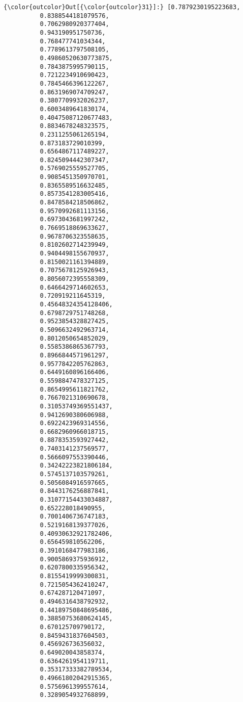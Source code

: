 \documentclass[11pt]{article}
\begin{document}
\begin{Verbatim}[commandchars=\\\{\}]
{\color{outcolor}Out[{\color{outcolor}31}]:} [0.7879230195223683,
          0.8388544181079576,
          0.7062980920377404,
          0.943190951750736,
          0.768477741034344,
          0.7789613797508105,
          0.49860520630773875,
          0.7843875995790115,
          0.7212234910690423,
          0.7845466396122267,
          0.8631969074709247,
          0.3807709932026237,
          0.6003489641830174,
          0.40475087120677483,
          0.8834678248323575,
          0.2311255061265194,
          0.873183729010399,
          0.6564867117489227,
          0.8245094442307347,
          0.5769025559527705,
          0.9085451350970701,
          0.8365589516632485,
          0.8573541283005416,
          0.8478584218506862,
          0.9570992681113156,
          0.6973043681997242,
          0.7669518869633627,
          0.9678706323558635,
          0.8102602714239949,
          0.9404498155670937,
          0.8150021161394889,
          0.7075678125926943,
          0.8056072395558309,
          0.6466429714602653,
          0.720919211645319,
          0.45648324354128406,
          0.6798729751748268,
          0.9523854328827425,
          0.5096632492963714,
          0.8012050654852029,
          0.5585386865367793,
          0.8966844571961297,
          0.9577842205762863,
          0.6449160896166406,
          0.5598847478327125,
          0.8654995611821762,
          0.7667021310690678,
          0.31053749369551437,
          0.9412690380606988,
          0.6922423969314556,
          0.6682960966018715,
          0.8878353593927442,
          0.7403141237569577,
          0.5666097553390446,
          0.34242223821806184,
          0.5745137103579261,
          0.5056084916597665,
          0.8443176256887841,
          0.31077154433034887,
          0.652228018490955,
          0.7001406736747183,
          0.5219168139377026,
          0.40930632921782406,
          0.656459810562206,
          0.3910168477983186,
          0.9005869375936912,
          0.6207800335956342,
          0.8155419999300831,
          0.7215054362410247,
          0.674287120471097,
          0.4946316438792932,
          0.44189750848695486,
          0.38850753680624145,
          0.670125709790172,
          0.8459431837604503,
          0.456926736356032,
          0.649020043858374,
          0.6364261954119711,
          0.35317333382789534,
          0.49661802042915365,
          0.5756961399557614,
          0.3289054932768899,

\end{Verbatim}
\end{document}
